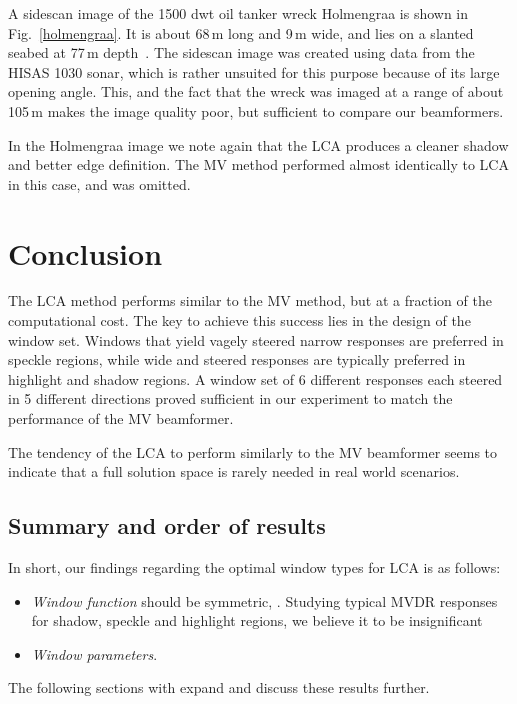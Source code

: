 \documentclass[10pt,journal,draftclsnofoot,onecolumn]{IEEEtran}
\newcommand\Fig[1]{Fig.~\ref{#1}}
\newcommand\1{\vec 1}
\begin{document}
A sidescan image of the 1500 dwt oil tanker wreck Holmengraa is shown in \Fig{holmengraa}. It is about 68\,m long and 9\,m wide, and lies on a slanted seabed at 77\,m depth~\cite{holmengraa}. The sidescan image was created using data from the HISAS 1030 sonar, which is rather unsuited for this purpose because of its large opening angle. This, and the fact that the wreck was imaged at a range of about 105\,m makes the image quality poor, but sufficient to compare our beamformers. 

In the Holmengraa image we note again that the LCA produces a cleaner shadow and better edge definition. The MV method performed almost identically to LCA in this case, and was omitted.


\section{Conclusion}

The LCA method performs similar to the MV method, but at a fraction of the computational cost. The key to achieve this success lies in the design of the window set. Windows that yield vagely steered narrow responses are preferred in speckle regions, while wide and steered responses are typically preferred in highlight and shadow regions. A window set of 6 different responses each steered in 5 different directions proved sufficient in our experiment to match the performance of the MV beamformer.

The tendency of the LCA to perform similarly to the MV beamformer seems to indicate that a full solution space is rarely needed in real world scenarios. 


\subsection{Summary and order of results}

In short, our findings regarding the optimal window types for LCA is as follows:

\begin{itemize}
\item \emph{Window function} should be symmetric, . Studying typical MVDR responses for shadow, speckle and highlight regions, we believe it to be insignificant
\item \emph{Window parameters}. 
\end{itemize}

The following sections with expand and discuss these results further.
\end{document}
